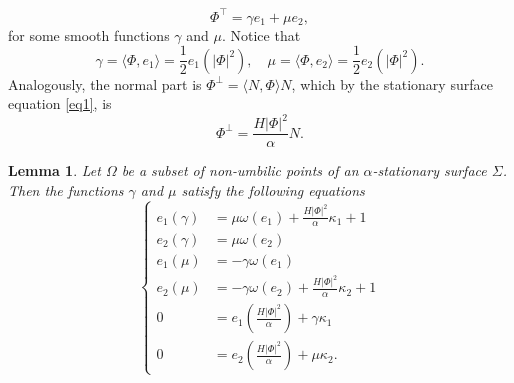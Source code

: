 \documentclass[a4paper,12pt]{amsart}
\newtheorem{lemma}[theorem]{Lemma}
\theoremstyle{definition}
\begin{document}
\begin{equation*}
\Phi^\top=\gamma e_1+\mu e_2,
\end{equation*}
for some smooth functions $\gamma$ and $\mu$. Notice that 
$$\gamma=\langle \Phi,e_1\rangle=\frac12e_1(|\Phi|^2),\quad \mu=\langle\Phi,e_2\rangle=\frac12e_2(|\Phi|^2).$$
 Analogously, the normal part  is  $\Phi^\perp=\langle N,\Phi\rangle N$, which by the stationary surface equation \eqref{eq1}, is
$$\Phi^{\perp}=\frac{H|\Phi|^2}{\alpha}N.$$
\begin{lemma}\label{l2}
Let $\Omega$ be a subset of non-umbilic points of an $\alpha$-stationary surface $\Sigma$. Then the functions   $\gamma$ and $\mu$ satisfy the following equations
    \begin{equation}\label{d3}
    \left\{
\begin{split}
            e_{1}(\gamma)&=\mu\omega(e_1)+\frac{H|\Phi|^2}{\alpha}\kappa_1+1\\
            e_{2}(\gamma)&=\mu\omega(e_2)\\
            e_{1}(\mu)&=-\gamma\omega(e_1)\\
            e_{2}(\mu)&=-\gamma\omega(e_2)+\frac{H|\Phi|^2}{\alpha}\kappa_2+1\\
            0&=e_{1}(\frac{H|\Phi|^2}{\alpha})+\gamma\kappa_1\\
            0&=e_{2}(\frac{H|\Phi|^2}{\alpha})+\mu\kappa_2.
        \end{split}\right.
    \end{equation}
\end{lemma}
\end{document}
